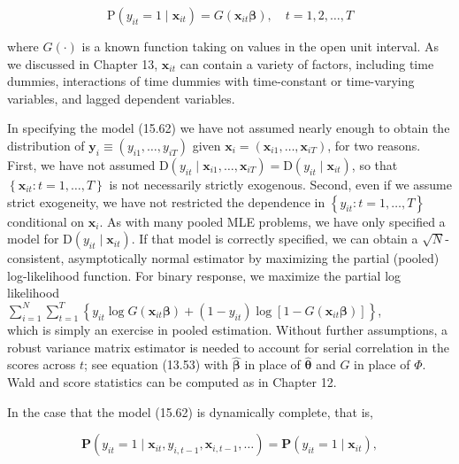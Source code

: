 \documentclass[10pt]{article}
\begin{document}
\begin{equation*}
\mathrm{P}\left(y_{i t}=1 \mid \mathbf{x}_{i t}\right)=G\left(\mathbf{x}_{i t} \boldsymbol{\beta}\right), \quad t=1,2, \ldots, T \tag{15.62}
\end{equation*}


where $G(\cdot)$ is a known function taking on values in the open unit interval. As we discussed in Chapter 13, $\mathbf{x}_{i t}$ can contain a variety of factors, including time dummies, interactions of time dummies with time-constant or time-varying variables, and lagged dependent variables.

In specifying the model (15.62) we have not assumed nearly enough to obtain the distribution of $\mathbf{y}_{i} \equiv\left(y_{i 1}, \ldots, y_{i T}\right)$ given $\mathbf{x}_{i}=\left(\mathbf{x}_{i 1}, \ldots, \mathbf{x}_{i T}\right)$, for two reasons. First, we have not assumed $\mathrm{D}\left(y_{i t} \mid \mathbf{x}_{i 1}, \ldots, \mathbf{x}_{i T}\right)=\mathrm{D}\left(y_{i t} \mid \mathbf{x}_{i t}\right)$, so that $\left\{\mathbf{x}_{i t}: t=1, \ldots, T\right\}$ is not necessarily strictly exogenous. Second, even if we assume strict exogeneity, we have not restricted the dependence in $\left\{y_{i t}: t=1, \ldots, T\right\}$ conditional on $\mathbf{x}_{i}$. As with many pooled MLE problems, we have only specified a model for $\mathrm{D}\left(y_{i t} \mid \mathbf{x}_{i t}\right)$. If that model is correctly specified, we can obtain a $\sqrt{N}$-consistent, asymptotically normal estimator by maximizing the partial (pooled) log-likelihood function. For binary response, we maximize the partial log likelihood\\
$\sum_{i=1}^{N} \sum_{t=1}^{T}\left\{y_{i t} \log G\left(\mathbf{x}_{i t} \boldsymbol{\beta}\right)+\left(1-y_{i t}\right) \log \left[1-G\left(\mathbf{x}_{i t} \boldsymbol{\beta}\right)\right]\right\}$,\\
which is simply an exercise in pooled estimation. Without further assumptions, a robust variance matrix estimator is needed to account for serial correlation in the scores across $t$; see equation (13.53) with $\hat{\boldsymbol{\beta}}$ in place of $\hat{\boldsymbol{\theta}}$ and $G$ in place of $\Phi$. Wald and score statistics can be computed as in Chapter 12.

In the case that the model (15.62) is dynamically complete, that is,


\begin{equation*}
\mathbf{P}\left(y_{i t}=1 \mid \mathbf{x}_{i t}, y_{i, t-1}, \mathbf{x}_{i, t-1}, \ldots\right)=\mathbf{P}\left(y_{i t}=1 \mid \mathbf{x}_{i t}\right), \tag{15.63}
\end{equation*}
\end{document}
